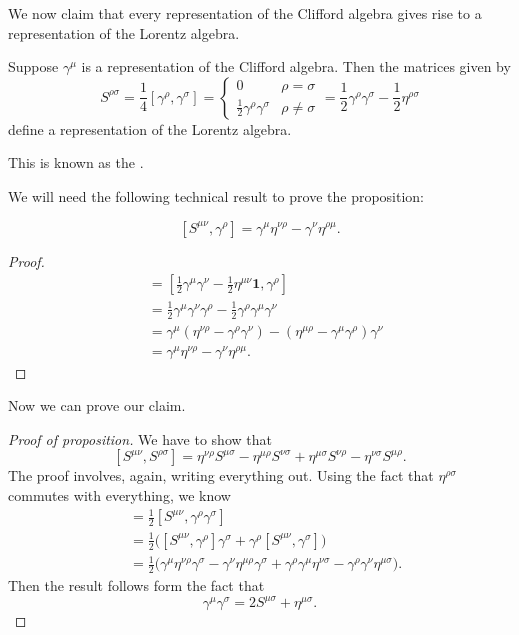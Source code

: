 \documentclass[a4paper]{article}
\begin{document}
We now claim that every representation of the Clifford algebra gives rise to a representation of the Lorentz algebra.

\begin{prop}
  Suppose $\gamma^\mu$ is a representation of the Clifford algebra. Then the matrices given by
  \[
    S^{\rho\sigma} = \frac{1}{4}[\gamma^\rho, \gamma^\sigma] =
    \begin{cases}
      0 & \rho = \sigma\\
      \frac{1}{2}\gamma^\rho \gamma^\sigma & \rho \not= \sigma
    \end{cases}
    = \frac{1}{2} \gamma^\rho \gamma^\sigma - \frac{1}{2}\eta^{\rho\sigma}
  \]
  define a representation of the Lorentz algebra.
\end{prop}
This is known as the .

We will need the following technical result to prove the proposition:
\begin{lemma}
  \[
    [S^{\mu\nu}, \gamma^\rho] = \gamma^\mu \eta^{\nu\rho} - \gamma^\nu \eta^{\rho\mu}.
  \]
\end{lemma}

\begin{proof}
  \begin{align*}
    [S^{\mu\nu}, \gamma^\rho] &= \left[\frac{1}{2} \gamma^\mu\gamma^\nu - \frac{1}{2}\eta^{\mu\nu}\mathbf{1}, \gamma^\rho\right]\\
    &= \frac{1}{2} \gamma^\mu \gamma^\nu \gamma^\rho - \frac{1}{2} \gamma^\rho \gamma^\mu \gamma^\nu\\
    &= \gamma^\mu (\eta^{\nu\rho} - \gamma^\rho \gamma^\nu) - (\eta^{\mu\rho} - \gamma^\mu \gamma^\rho)\gamma^\nu\\
    &= \gamma^\mu \eta^{\nu\rho} - \gamma^\nu \eta^{\rho\mu}.
  \end{align*}
\end{proof}

Now we can prove our claim.

\begin{proof}[Proof of proposition]
  We have to show that
  \[
    [S^{\mu\nu}, S^{\rho\sigma}] = \eta^{\nu\rho} S^{\mu\sigma} - \eta^{\mu\rho} S^{\nu\sigma} + \eta^{\mu\sigma} S^{\nu\rho} - \eta^{\nu\sigma} S^{\mu\rho}.
  \]
  The proof involves, again, writing everything out. Using the fact that $\eta^{\rho\sigma}$ commutes with everything, we know
  \begin{align*}
    [S^{\mu\nu}, S^{\rho\sigma}] &= \frac{1}{2}[S^{\mu\nu}, \gamma^\rho \gamma^\sigma]\\
    &= \frac{1}{2}\big([S^{\mu\nu}, \gamma^\rho] \gamma^\sigma + \gamma^\rho[S^{\mu\nu}, \gamma^\sigma]\big)\\
    &= \frac{1}{2}\big(\gamma^\mu \eta^{\nu \rho} \gamma^\sigma - \gamma^\nu \eta^{\mu\rho} \gamma^\sigma + \gamma^\rho \gamma^\mu \eta^{\nu\sigma} - \gamma^\rho \gamma^\nu \eta^{\mu\sigma}\big).
  \end{align*}
  Then the result follows form the fact that
  \[
    \gamma^\mu \gamma^\sigma = 2 S^{\mu\sigma} + \eta^{\mu\sigma}.
  \]
\end{proof}
\end{document}
